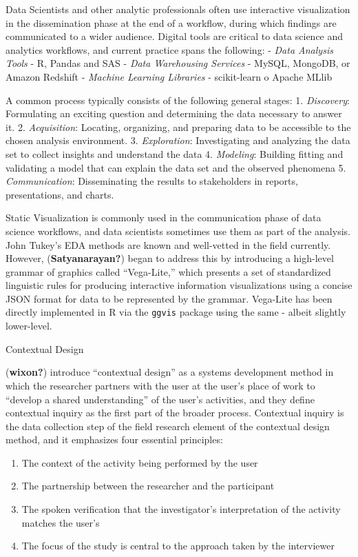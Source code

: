 \documentclass[print]{nuthesis}
\providecommand{\tightlist}{%
  \setlength{\itemsep}{0pt}\setlength{\parskip}{0pt}}
\begin{document}
Data Scientists and other analytic professionals often use interactive visualization in the dissemination phase at the end of a workflow, during which findings are communicated to a wider audience. Digital tools are critical to data science and analytics workflows, and current practice spans the following:
- \emph{Data Analysis Tools} - R, Pandas and SAS
- \emph{Data Warehousing Services} - MySQL, MongoDB, or Amazon Redshift
- \emph{Machine Learning Libraries} - scikit-learn o Apache MLlib

A common process typically consists of the following general stages:
1. \emph{Discovery}: Formulating an exciting question and determining the data necessary to answer it.
2. \emph{Acquisition}: Locating, organizing, and preparing data to be accessible to the chosen analysis environment.
3. \emph{Exploration}: Investigating and analyzing the data set to collect insights and understand the data
4. \emph{Modeling}: Building fitting and validating a model that can explain the data set and the observed phenomena
5. \emph{Communication}: Disseminating the results to stakeholders in reports, presentations, and charts.

Static Visualization is commonly used in the communication phase of data science workflows, and data scientists sometimes use them as part of the analysis. John Tukey's EDA methods are known and well-vetted in the field currently. However, (\textbf{Satyanarayan?}) began to address this by introducing a high-level grammar of graphics called ``Vega-Lite,'' which presents a set of standardized linguistic rules for producing interactive information visualizations using a concise JSON format for data to be represented by the grammar. Vega-Lite has been directly implemented in R via the \texttt{ggvis} package using the same - albeit slightly lower-level.

Contextual Design

(\textbf{wixon?}) introduce ``contextual design'' as a systems development method in which the researcher partners with the user at the user's place of work to ``develop a shared understanding'' of the user's activities, and they define contextual inquiry as the first part of the broader process. Contextual inquiry is the data collection step of the field research element of the contextual design method, and it emphasizes four essential principles:

\begin{enumerate}
\def\labelenumi{\arabic{enumi}.}
\tightlist
\item
  The context of the activity being performed by the user
\item
  The partnership between the researcher and the participant
\item
  The spoken verification that the investigator's interpretation of the activity matches the user's
\item
  The focus of the study is central to the approach taken by the interviewer
\end{enumerate}
\end{document}

